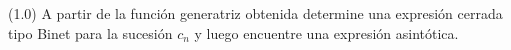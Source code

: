 (1.0) A partir de la función generatriz obtenida determine una expresión cerrada tipo Binet para la sucesión $c_n$ y luego encuentre una expresión asintótica.